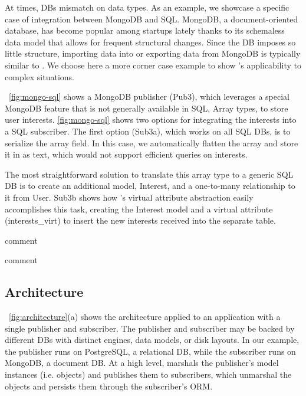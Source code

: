 At times, DBs mismatch on data types.  As an example, we showcase a specific
case of integration between MongoDB and SQL.
MongoDB, a document-oriented database, has become popular among startups
lately thanks to its schemaless data model that allows for frequent
structural changes.  Since the DB imposes so little structure, importing data
into or exporting data from MongoDB is typically similar to
\label{fig:mongo-to-star}. We choose here a more corner case example to
show \synapse's applicability to complex situations.

\F~\ref{fig:mongo-sql} shows a MongoDB publisher (Pub3), which leverages a
special MongoDB feature that is not generally available in SQL,
Array types, to store user interests.  \F\ref{fig:mongo-sql} shows two options
for integrating the interests into a SQL subscriber.  The first option (Sub3a),
which works on all SQL DBs, is to serialize the array field.
In this case, we automatically flatten the array and store it in as text, which would not support efficient queries on interests.

The most straightforward solution to translate this array type to a generic SQL DB is to create an additional model, {\code \footnotesize Interest}, and a one-to-many relationship to it from {\code \footnotesize User}.
Sub3b shows how \synapse's virtual attribute abstraction easily accomplishes
this task, creating the {\code \footnotesize Interest} model and a virtual
attribute  ({\code \footnotesize interests\_virt}) to insert the new interests
received into the separate table.

   comment

   comment
\subsection{\synapse Architecture}
\label{sec:arch}

\F~\ref{fig:architecture}(a) shows the \synapse architecture applied to an
application with a single publisher and subscriber. The publisher and subscriber
may be backed by different DBs with distinct engines, data models, or disk
layouts. In our example, the publisher runs on PostgreSQL, a relational DB,
while the subscriber runs on MongoDB, a document DB. At a high level, \synapse
marshals the publisher's model instances (i.e. objects) and publishes them to
subscribers, which unmarshal the objects and persists them through the
subscriber's ORM.

